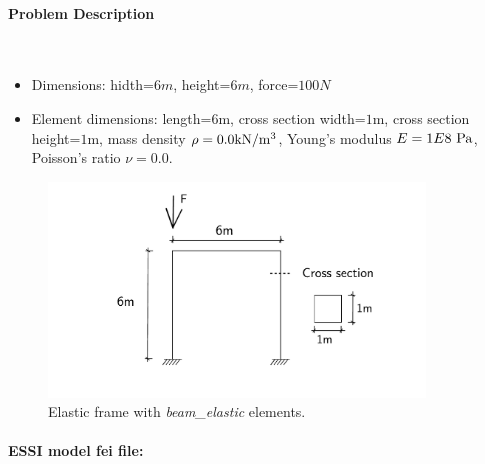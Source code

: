 \documentclass[fleqn,11pt]{article}
\begin{document}
\paragraph{Problem Description} ~ 


\begin{itemize} 

\item Dimensions: hidth=$6m$, height=$6m$, force=$100N$

\item Element dimensions: length=$6$m,   
                    cross section width=$1$m,   
                    cross section height=$1$m,  
                    mass density $\rho=0.0 {\rm kN/m^3}$,  
                    Young's modulus $E=1E8~{\rm Pa}$,  
                    Poisson's ratio $\nu=0.0$.
\end{itemize}


\begin{figure}[!htb]
  \centering
  \includegraphics[width=10cm]{../Figure-files/_Chapter_Appendix_Illustrative_Examples/beam_elastic_frame_descrip.pdf}
  \caption{Elastic frame with \emph{beam\_elastic} elements.}
  \label{fig_frame}
\end{figure}





\paragraph{ESSI model fei file:} ~
\end{document}
